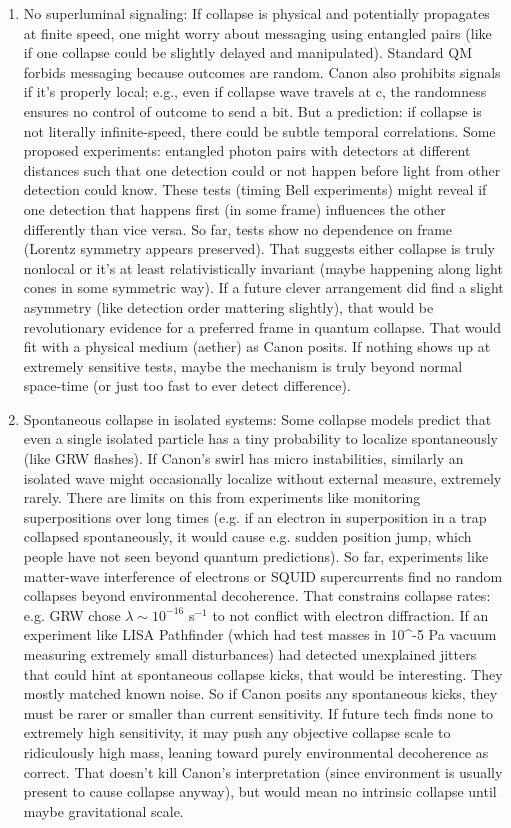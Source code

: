 \documentclass[11pt]{article}
\begin{document}
\begin{enumerate}
\item 
No superluminal signaling: If collapse is physical and potentially propagates at finite speed, one might worry about messaging using entangled pairs (like if one collapse could be slightly delayed and manipulated). Standard QM forbids messaging because outcomes are random. Canon also prohibits signals if it’s properly local; e.g., even if collapse wave travels at c, the randomness ensures no control of outcome to send a bit. But a prediction: if collapse is not literally infinite-speed, there could be subtle temporal correlations. Some proposed experiments: entangled photon pairs with detectors at different distances such that one detection could or not happen before light from other detection could know. These tests (timing Bell experiments) might reveal if one detection that happens first (in some frame) influences the other differently than vice versa. So far, tests show no dependence on frame (Lorentz symmetry appears preserved). That suggests either collapse is truly nonlocal or it’s at least relativistically invariant (maybe happening along light cones in some symmetric way). If a future clever arrangement did find a slight asymmetry (like detection order mattering slightly), that would be revolutionary evidence for a preferred frame in quantum collapse. That would fit with a physical medium (aether) as Canon posits. If nothing shows up at extremely sensitive tests, maybe the mechanism is truly beyond normal space-time (or just too fast to ever detect difference).




\item 
Spontaneous collapse in isolated systems: Some collapse models predict that even a single isolated particle has a tiny probability to localize spontaneously (like GRW flashes). If Canon’s swirl has micro instabilities, similarly an isolated wave might occasionally localize without external measure, extremely rarely. There are limits on this from experiments like monitoring superpositions over long times (e.g. if an electron in superposition in a trap collapsed spontaneously, it would cause e.g. sudden position jump, which people have not seen beyond quantum predictions). So far, experiments like matter-wave interference of electrons or SQUID supercurrents find no random collapses beyond environmental decoherence. That constrains collapse rates: e.g. GRW chose $\lambda \sim 10^{-16}$ s$^{-1}$ to not conflict with electron diffraction. If an experiment like LISA Pathfinder (which had test masses in 10^-5 Pa vacuum measuring extremely small disturbances) had detected unexplained jitters that could hint at spontaneous collapse kicks, that would be interesting. They mostly matched known noise. So if Canon posits any spontaneous kicks, they must be rarer or smaller than current sensitivity. If future tech finds none to extremely high sensitivity, it may push any objective collapse scale to ridiculously high mass, leaning toward purely environmental decoherence as correct. That doesn’t kill Canon’s interpretation (since environment is usually present to cause collapse anyway), but would mean no intrinsic collapse until maybe gravitational scale.





\end{enumerate}
\end{document}
